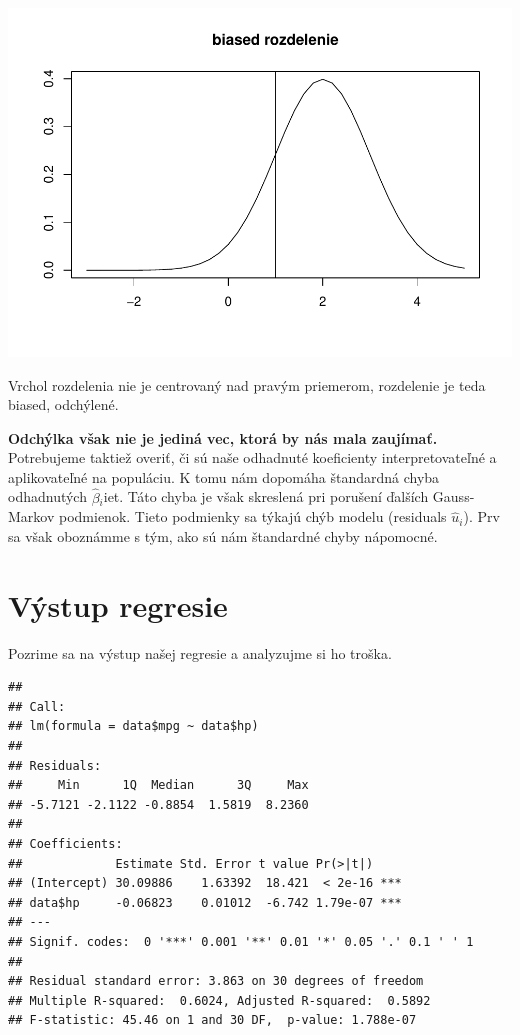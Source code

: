 \includegraphics{test_files/figure-latex/unnamed-chunk-45-1.pdf}

Vrchol rozdelenia nie je centrovaný nad pravým priemerom, rozdelenie je
teda biased, odchýlené.

\textbf{Odchýlka však nie je jediná vec, ktorá by nás mala zaujímať.}
Potrebujeme taktiež overiť, či sú naše odhadnuté koeficienty
interpretovateľné a aplikovateľné na populáciu. K tomu nám dopomáha
štandardná chyba odhadnutých \(\hat\beta{}_i\)iet. Táto chyba je však
skreslená pri porušení ďalších Gauss-Markov podmienok. Tieto podmienky
sa týkajú chýb modelu (residuals \(\hat u_i\)). Prv sa však oboznámme s
tým, ako sú nám štandardné chyby nápomocné.

\newpage

\hypertarget{vuxfdstup-regresie}{%
\section{Výstup regresie}\label{vuxfdstup-regresie}}

Pozrime sa na výstup našej regresie a analyzujme si ho troška.

\begin{Shaded}
\begin{Highlighting}[]
\end{Highlighting}
\end{Shaded}

\begin{verbatim}
## 
## Call:
## lm(formula = data$mpg ~ data$hp)
## 
## Residuals:
##     Min      1Q  Median      3Q     Max 
## -5.7121 -2.1122 -0.8854  1.5819  8.2360 
## 
## Coefficients:
##             Estimate Std. Error t value Pr(>|t|)    
## (Intercept) 30.09886    1.63392  18.421  < 2e-16 ***
## data$hp     -0.06823    0.01012  -6.742 1.79e-07 ***
## ---
## Signif. codes:  0 '***' 0.001 '**' 0.01 '*' 0.05 '.' 0.1 ' ' 1
## 
## Residual standard error: 3.863 on 30 degrees of freedom
## Multiple R-squared:  0.6024, Adjusted R-squared:  0.5892 
## F-statistic: 45.46 on 1 and 30 DF,  p-value: 1.788e-07
\end{verbatim}

